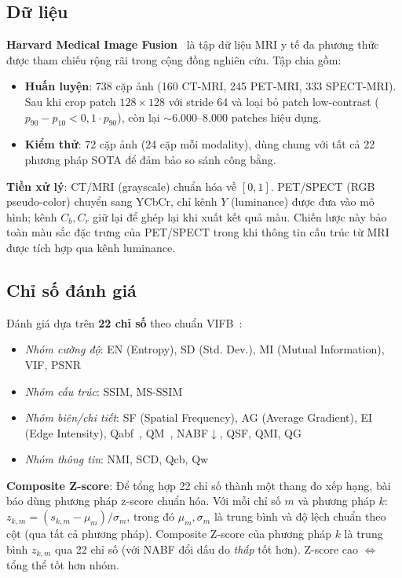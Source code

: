 \documentclass[12pt,a4paper]{article}
\begin{document}
\subsection{Dữ liệu}

\textbf{Harvard Medical Image Fusion}~\cite{zhao2023cddfuse} là tập dữ liệu MRI
y tế đa phương thức được tham chiếu rộng rãi trong cộng đồng nghiên cứu. Tập
chia gồm:
\begin{itemize}\itemsep1pt
  \item \textbf{Huấn luyện}: 738 cặp ảnh (160 CT-MRI, 245 PET-MRI, 333
        SPECT-MRI). Sau khi crop patch $128\times128$ với stride 64 và loại bỏ
        patch low-contrast ($p_{90}-p_{10} < 0{,}1 \cdot p_{90}$), còn lại
        $\sim$6.000--8.000 patches hiệu dụng.
  \item \textbf{Kiểm thử}: 72 cặp ảnh (24 cặp mỗi modality), dùng chung với
        tất cả 22 phương pháp SOTA để đảm bảo so sánh công bằng.
\end{itemize}

\textbf{Tiền xử lý}: CT/MRI (grayscale) chuẩn hóa về $[0,1]$. PET/SPECT (RGB
pseudo-color) chuyển sang YCbCr, chỉ kênh $Y$ (luminance) được đưa vào mô hình;
kênh $C_b, C_r$ giữ lại để ghép lại khi xuất kết quả màu. Chiến lược này bảo
toàn màu sắc đặc trưng của PET/SPECT trong khi thông tin cấu trúc từ MRI được
tích hợp qua kênh luminance.

\subsection{Chỉ số đánh giá}

Đánh giá dựa trên \textbf{22 chỉ số} theo chuẩn VIFB~\cite{liu2020vifb}:
\begin{itemize}\itemsep1pt
  \item \textit{Nhóm cường độ}: EN (Entropy), SD (Std. Dev.), MI (Mutual
        Information), VIF, PSNR
  \item \textit{Nhóm cấu trúc}: SSIM, MS-SSIM
  \item \textit{Nhóm biên/chi tiết}: SF (Spatial Frequency), AG (Average
        Gradient), EI (Edge Intensity), Qabf~\cite{xydeas2000objective},
        QM~\cite{piella2003new}, NABF$\downarrow$, QSF, QMI, QG
  \item \textit{Nhóm thông tin}: NMI, SCD, Qcb, Qw
\end{itemize}

\textbf{Composite Z-score}: Để tổng hợp 22 chỉ số thành một thang đo xếp hạng,
bài báo dùng phương pháp z-score chuẩn hóa. Với mỗi chỉ số $m$ và phương pháp
$k$: $z_{k,m} = (s_{k,m} - \mu_m)/\sigma_m$, trong đó $\mu_m, \sigma_m$ là
trung bình và độ lệch chuẩn theo cột (qua tất cả phương pháp). Composite Z-score
của phương pháp $k$ là trung bình $z_{k,m}$ qua 22 chỉ số (với NABF đổi dấu do
\textit{thấp} tốt hơn). Z-score cao $\Leftrightarrow$ tổng thể tốt hơn nhóm.
\end{document}

